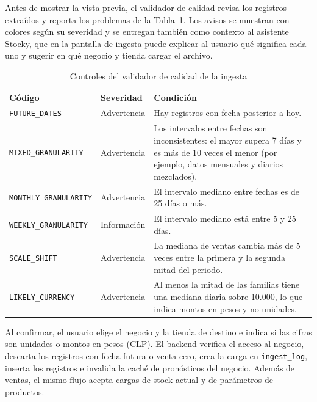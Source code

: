 \documentclass[12pt, a4paper]{report}
\begin{document}
Antes de mostrar la vista previa, el validador de calidad revisa los registros extraídos y
reporta los problemas de la Tabla~\ref{tab:validador}. Los avisos se muestran con colores
según su severidad y se entregan también como contexto al asistente Stocky, que en la
pantalla de ingesta puede explicar al usuario qué significa cada uno y sugerir en qué
negocio y tienda cargar el archivo.

\begin{table}[H]
  \centering
  \caption{Controles del validador de calidad de la ingesta}
  \label{tab:validador}
  \small
  \begin{tabular}{|p{4.0cm}|p{2.2cm}|p{7.4cm}|}
    \hline
    \textbf{Código} & \textbf{Severidad} & \textbf{Condición} \\
    \hline
    \texttt{FUTURE\_DATES}        & Advertencia & Hay registros con fecha posterior a hoy. \\
    \texttt{MIXED\_GRANULARITY}   & Advertencia & Los intervalos entre fechas son inconsistentes:
                                                  el mayor supera 7 días y es más de 10 veces el menor
                                                  (por ejemplo, datos mensuales y diarios mezclados). \\
    \texttt{MONTHLY\_GRANULARITY} & Advertencia & El intervalo mediano entre fechas es de 25 días o más. \\
    \texttt{WEEKLY\_GRANULARITY}  & Información & El intervalo mediano está entre 5 y 25 días. \\
    \texttt{SCALE\_SHIFT}         & Advertencia & La mediana de ventas cambia más de 5 veces entre la
                                                  primera y la segunda mitad del periodo. \\
    \texttt{LIKELY\_CURRENCY}     & Advertencia & Al menos la mitad de las familias tiene una mediana
                                                  diaria sobre 10.000, lo que indica montos en pesos y no
                                                  unidades. \\
    \hline
  \end{tabular}
\end{table}

Al confirmar, el usuario elige el negocio y la tienda de destino e indica si las cifras son
unidades o montos en pesos (CLP). El backend verifica el acceso al negocio, descarta los
registros con fecha futura o venta cero, crea la carga en \texttt{ingest\_log}, inserta los
registros e invalida la caché de pronósticos del negocio. Además de ventas, el mismo flujo
acepta cargas de stock actual y de parámetros de productos.
\end{document}
